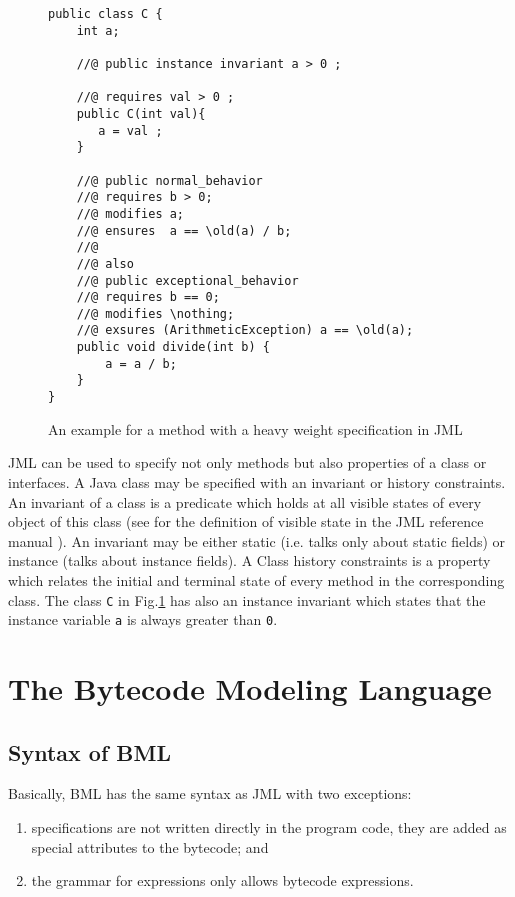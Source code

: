 \documentclass[a4paper]{llncs}
\begin{document}
   
\begin{figure}
\begin{lstlisting}[frame=trbl]
public class C {
    int a;
    
    //@ public instance invariant a > 0 ;
    
    //@ requires val > 0 ;
    public C(int val){
       a = val ;
    }
   
    //@ public normal_behavior
    //@ requires b > 0;
    //@ modifies a;
    //@ ensures  a == \old(a) / b;  
    //@
    //@ also 
    //@ public exceptional_behavior
    //@ requires b == 0;
    //@ modifies \nothing;
    //@ exsures (ArithmeticException) a == \old(a);
    public void divide(int b) {
        a = a / b;
    }
}
\end{lstlisting}
\caption{\sc An example for a method with a heavy weight specification in JML} \label{bml:heavySp}
\end{figure}

JML can be used to specify not only methods but also properties of a class or interfaces. 
A Java class may be specified with an invariant or history constraints. An invariant of a class is a predicate which holds at all visible states of
  every object of this class (see for the definition of visible state in the JML reference manual \cite{december-jml}). An invariant may be either static 
 (i.e. talks only about static fields) or instance (talks about instance fields).
  A Class history constraints is a property which relates the initial and terminal state of every method in the corresponding class. 
 The class \texttt{C}  in Fig.\ref{bml:heavySp} has also an instance invariant which states that the instance variable \texttt{a} is
 always greater than \texttt{0}.



\section{The Bytecode Modeling Language}
\label{SecBML}


\subsection{Syntax of BML}

Basically, BML has the same syntax as JML with two exceptions:
\begin{enumerate}
\item specifications are not written directly in the program code,
they are added as special attributes to the bytecode; and
\item the grammar for expressions only allows bytecode expressions.
\end{enumerate}
\end{document}
